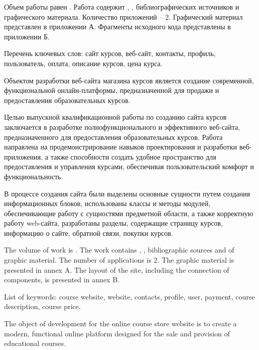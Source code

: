 
Объем работы равен . Работа содержит , ,  библиографических источников и  графического материала. Количество приложений – 2. Графический материал представлен в приложении А. Фрагменты исходного кода представлены в приложении Б.

Перечень ключевых слов: сайт курсов, веб-сайт, контакты, профиль, пользователь, оплата, описание курсов, цена курса.

Объектом разработки веб-сайта магазина курсов является создание современной, функциональной онлайн-платформы, предназначенной для продажи и предоставления образовательных курсов.

Целью выпускной квалификационной работы по созданию сайта курсов заключается в разработке полнофункционального и эффективного веб-сайта, предназначенного для предоставления образовательных курсов. Работа направлена на продемонстрирование навыков проектирования и разработки веб-приложения, а также способности создать удобное пространство для предоставления и управления курсами, обеспечивая пользовательский комфорт и функциональность.

В процессе создания сайта были выделены основные сущности путем создания информационных блоков, использованы классы и методы модулей, обеспечивающие работу с сущностями предметной области, а также корректную работу web-сайта, разработаны разделы, содержащие страницу курсов, информацию о сайте, обратной связи, покупки курсов.


  
The volume of work is . The work contains , ,  bibliographic sources and  of graphic material. The number of applications is 2. The graphic material is presented in annex A. The layout of the site, including the connection of components, is presented in annex B.

List of keywords: course website, website, contacts, profile, user, payment, course description, course price.

The object of development for the online course store website is to create a modern, functional online platform designed for the sale and provision of educational courses.

